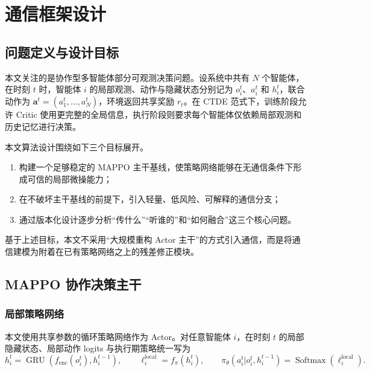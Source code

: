 \chapter{通信框架设计}

\section{问题定义与设计目标}

本文关注的是协作型多智能体部分可观测决策问题。设系统中共有 $N$ 个智能体，在时刻 $t$ 时，智能体 $i$ 的局部观测、动作与隐藏状态分别记为 $o_i^t$、$a_i^t$ 和 $h_i^t$，联合动作为 $\mathbf{a}^t=(a_1^t,\dots,a_N^t)$，环境返回共享奖励 $r_t$。在 CTDE 范式下，训练阶段允许 Critic 使用更完整的全局信息，执行阶段则要求每个智能体仅依赖局部观测和历史记忆进行决策。

本文算法设计围绕如下三个目标展开。
\begin{enumerate}
    \item 构建一个足够稳定的 MAPPO 主干基线，使策略网络能够在无通信条件下形成可信的局部微操能力；
    \item 在不破坏主干基线的前提下，引入轻量、低风险、可解释的通信分支；
    \item 通过版本化设计逐步分析“传什么”“听谁的”和“如何融合”这三个核心问题。
\end{enumerate}

基于上述目标，本文不采用“大规模重构 Actor 主干”的方式引入通信，而是将通信建模为附着在已有策略网络之上的残差修正模块。

\section{MAPPO 协作决策主干}

\subsection{局部策略网络}

本文使用共享参数的循环策略网络作为 Actor。对任意智能体 $i$，在时刻 $t$ 的局部隐藏状态、局部动作 logits 与执行期策略统一写为
\begin{equation}
h_i^t = \operatorname{GRU}(f_{\text{enc}}(o_i^t), h_i^{t-1}),\qquad
\ell_i^{\text{local}} = f_{\pi}(h_i^t),\qquad
\pi_{\theta}(a_i^t|o_i^t,h_i^{t-1})=
\operatorname{Softmax}\!\left(\ell_i^{\text{local}}\right).
\end{equation}

